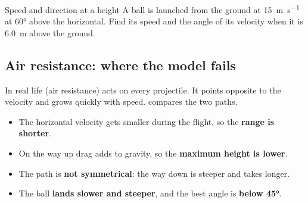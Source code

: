 \begin{workedexample}{Speed and direction at a height}\label{ch1:we:energyangle}
A ball is launched from the ground at \qty{15}{m.s^{-1}} at \ang{60} above the horizontal.
Find its speed and the angle of its velocity when it is \qty{6.0}{m} above the ground.
\end{workedexample}

\subsection{Air resistance: where the model fails}
In real life  (air resistance) acts on every projectile. It points opposite to the
velocity and grows quickly with speed.  compares the two paths.
\begin{itemize}
  \item The horizontal velocity gets smaller during the flight, so the \textbf{range is shorter}.
  \item On the way up drag adds to gravity, so the \textbf{maximum height is lower}.
  \item The path is \textbf{not symmetrical}: the way down is steeper and takes longer.
  \item The ball \textbf{lands slower and steeper}, and the best angle is \textbf{below \ang{45}}.
\end{itemize}


